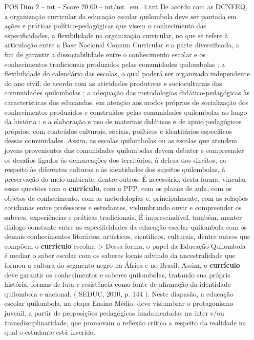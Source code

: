 \begin{textsample}{POS Dim 2 – mt – Score 20.00 – mt/mt\_em\_4.txt}
De acordo com as DCNEEQ, a organização curricular da educação escolar quilombola deve ser pautada em ações e práticas político-pedagógicas que visem o conhecimento das especificidades, a flexibilidade na organização curricular, no que se refere à articulação entre a Base Nacional Comum Curricular e a parte diversificada, a fim de garantir a dissociabilidade entre o conhecimento escolar e os conhecimentos tradicionais produzidos pelas comunidades quilombolas ; a flexibilidade do calendário das escolas, o qual poderá ser organizado independente do ano civil, de acordo com as atividades produtivas e socioculturais das comunidades quilombolas ; a adequação das metodologias didático-pedagógicas às características dos educandos, em atenção aos modos próprios de socialização dos conhecimentos produzidos e construídos pelas comunidades quilombolas ao longo da história ; e a elaboração e uso de materiais didáticos e de apoio pedagógicos próprios, com conteúdos culturais, sociais, políticos e identitários específicos dessas comunidades.
Assim, as escolas quilombolas ou as escolas que atendem jovens provenientes das comunidades quilombolas devem debater e compreender os desafios ligados às demarcações dos territórios, à defesa dos direitos, ao respeito às diferentes culturas e às identidades dos sujeitos quilombolas, à preservação do meio ambiente, dentre outros.
É necessário, desta forma, vincular essas questões com o \textbf{currículo}, com o PPP, com os planos de aula, com os objetos de conhecimento, com as metodologias e, principalmente, com as relações cotidianas entre professores e estudantes, vislumbrando ouvir e compreender os saberes, experiências e práticas tradicionais.
É imprescindível, também, manter diálogo constante entre as especificidades da educação escolar quilombola com os demais conhecimentos literários, artísticos, científicos, culturais, dentre outros que compõem o \textbf{currículo} escolar. > Dessa forma, o papel da Educação Quilombola é mediar o saber escolar com os saberes locais advindo da ancestralidade que formou a cultura do segmento negro na África e no Brasil.
Assim, o \textbf{currículo} deve garantir os conhecimentos e saberes quilombolas, tratando sua própria história, formas de luta e resistência como fonte de afirmação da identidade quilombola e nacional. ( SEDUC, 2010, p. 144 ).
Neste diapasão, a educação escolar quilombola, na etapa Ensino Médio, deve vislumbrar o protagonismo juvenil, a partir de proposições pedagógicas fundamentadas na inter e/ou transdisciplinaridade, que promovam a reflexão crítica a respeito da realidade na qual o estudante está inserido.

\end{textsample}
